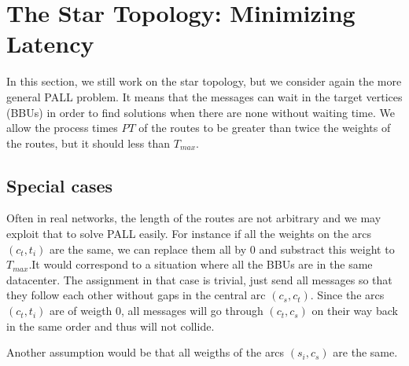 \documentclass[a4paper,10pt]{article}
\begin{document}
   \section{The Star Topology: Minimizing Latency}\label{sec:PALL}
    
    In this section, we still work on the star topology, but we consider again the more general PALL problem. It means that the messages can wait in the target vertices (BBUs) in order to find solutions when there are none without waiting time. We allow the process times $PT$ of the routes to be greater than twice the weights of the routes, but it should less than $T_{max}$.

	\subsection{Special cases}
		
		
	Often in real networks, the length of the routes are not arbitrary and we may exploit that to solve PALL easily. For instance if all the weights on the arcs $(c_t,t_i)$ are the same, we can replace them all by $0$ and substract this weight to $T_{max}$.It would correspond to a situation where all the BBUs are in the same datacenter.
	The assignment in that case is trivial, just send all messages so that they follow each other without gaps in the central arc $(c_s,c_t)$. Since the arcs $(c_t,t_i)$ are of weigth $0$, all messages will go through $(c_t,c_s)$ on their way back in
	the same order and thus will not collide. 
	
	Another assumption would be that all weigths of the arcs $(s_i,c_s)$ are the same.
	
\end{document}
